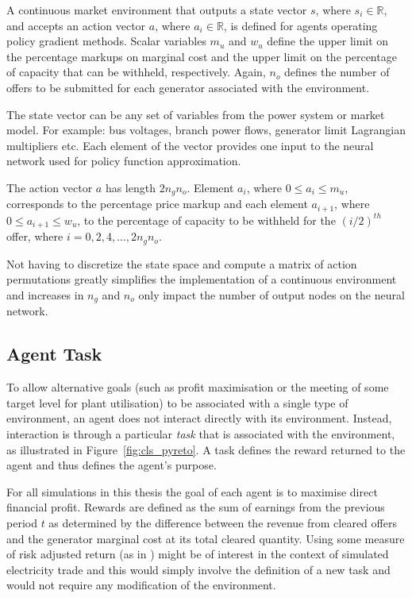 A continuous market environment that outputs a state vector $s$, where $s_i \in
\mathbb{R}$, and accepts an action vector $a$, where $a_i \in \mathbb{R}$, is
defined for agents operating policy gradient methods.  Scalar variables $m_{u}$
and $w_{u}$ define the upper limit on the percentage markups on marginal cost
and the upper limit on the percentage of capacity that can be withheld,
respectively.  Again, $n_o$ defines the number of offers to be submitted for
each generator associated with the environment.

The state vector can be any set of variables from the power system or market
model.  For example: bus voltages, branch power flows, generator limit
Lagrangian multipliers etc.  Each element of the vector provides one input to
the neural network used for policy function approximation.

The action vector $a$ has length $2n_gn_o$.  Element $a_i$, where $0\leq a_i
\leq m_{u}$, corresponds to the percentage price markup and each element
$a_{i+1}$, where $0\leq a_{i+1} \leq w_{u}$, to the percentage of capacity to be
withheld for the $(i/2)^{th}$ offer, where $i=0,2,4,\dotsc,2n_gn_o$.

Not having to discretize the state space and compute a matrix of action
permutations greatly simplifies the implementation of a continuous environment
and increases in $n_g$ and $n_o$ only impact the number of output nodes on the
neural network.

\subsection{Agent Task}
To allow alternative goals (such as profit maximisation or the meeting of some
target level for plant utilisation) to be associated with a single type of
environment, an agent does not interact directly with its environment. Instead,
interaction is through a particular \textit{task} that is associated with the
environment, as illustrated in Figure~\ref{fig:cls_pyreto}. A task defines the
reward returned to the agent and thus defines the agent's purpose.

For all simulations in this thesis the goal of each agent is to maximise direct
financial profit.  Rewards are defined as the sum of earnings from the previous
period $t$ as determined by the difference between the revenue from cleared
offers and the generator marginal cost at its total cleared quantity.  Using
some measure of risk adjusted return (as in \cite{moody:direct}) might be of
interest in the context of simulated electricity trade and this would simply
involve the definition of a new task and would not require any modification of
the environment.

